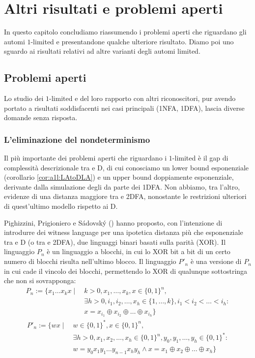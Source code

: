 \chapter{Altri risultati e problemi aperti}
In questo capitolo concludiamo riassumendo i problemi aperti che riguardano gli automi $1$-limited e presentandone qualche ulteriore risultato. Diamo poi uno sguardo ai risultati relativi ad altre varianti degli automi limited.



\section{Problemi aperti}
Lo studio dei $1$-limited e del loro rapporto con altri riconoscitori, pur avendo portato a risultati soddisfacenti nei casi principali (1NFA, 1DFA), lascia diverse domande senza risposta.


\subsection{L'eliminazione del nondeterminismo}
Il più importante dei problemi aperti che riguardano i $1$-limited è il gap di complessità descrizionale tra  e D, di cui conosciamo un lower bound esponenziale (corollario \ref{cor:a1l:LAtoDLA}) e un upper bound doppiamente esponenziale, derivante dalla simulazione degli  da parte dei 1DFA. Non abbiamo, tra l'altro, evidenze di una distanza maggiore tra  e 2DFA, nonostante le restrizioni ulteriori di quest'ultimo modello rispetto ai D.

Pighizzini, Prigioniero e Sádovský (\cite{Pighizzini:22:limitedwitness}) hanno proposto, con l'intenzione di introdurre dei witness language per una ipotetica distanza più che esponenziale tra  e D (o tra  e 2DFA), due linguaggi binari basati sulla parità (XOR). Il linguaggio $P_n$ è un linguaggio a blocchi, in cui lo XOR bit a bit di un certo numero di blocchi risulta nell'ultimo blocco. Il linguaggio $P'_n$ è una versione di $P_n$ in cui cade il vincolo dei blocchi, permettendo lo XOR di qualunque sottostringa che non si sovrapponga:
\begin{align*}
	P_n := \{  x_1\dots x_kx \mid ~ & k>0, x_1,\dots,x_k,x\in\{0,1\}^n,                                \\
	                                & \exists h>0,i_1,i_2,\dots,x_h\in\{1,\dots,k\},i_1<i_2<\dots<i_h: \\
	                                & x=x_{i_1}\oplus x_{i_2}\oplus\dots\oplus x_{i_h}\}
\end{align*}
\begin{align*}
	P'_n := \{  wx \mid ~ & w\in\{0,1\}^*,x\in\{0,1\}^n,                                                \\
	                      & \exists h>0,x_1,x_2,\dots,x_h\in\{0,1\}^n,y_0,y_1,\dots,y_h\in\{0,1\}^*:    \\
	                      & w=y_0x_1y_1\dots y_{n-1}x_hy_h \land x=x_1\oplus x_2\oplus\dots\oplus x_h\}
\end{align*}

